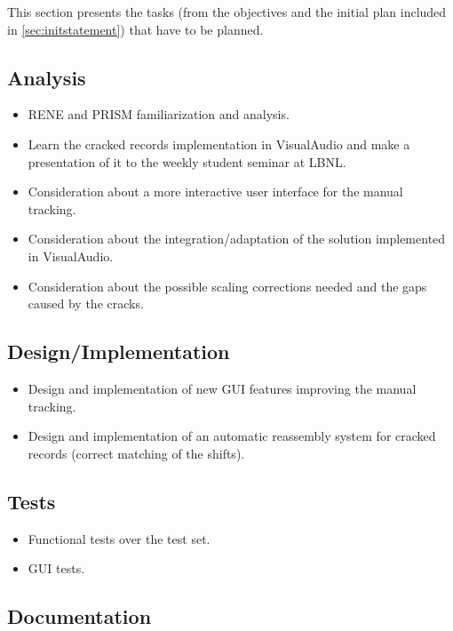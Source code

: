 This section presents the tasks (from the objectives and the initial plan included in \autoref{sec:initstatement}) that have to be planned.

\subsection{Analysis}

\begin{itemize}
    \item RENE and PRISM familiarization and analysis.
    \item Learn the cracked records implementation in VisualAudio and make a presentation of it to the weekly student seminar at LBNL.
    \item Consideration about a more interactive user interface for the manual tracking.
    \item Consideration about the integration/adaptation of the solution implemented in VisualAudio.
    \item Consideration about the possible scaling corrections needed and the gaps caused by the cracks.
\end{itemize}

\subsection{Design/Implementation}

\begin{itemize}
    \item Design and implementation of new GUI features improving the manual tracking.
    \item Design and implementation of an automatic reassembly system for cracked records (correct matching of the shifts).
\end{itemize}

\subsection{Tests}

\begin{itemize}
    \item Functional tests over the test set.
    \item GUI tests.
\end{itemize}

\subsection{Documentation}

